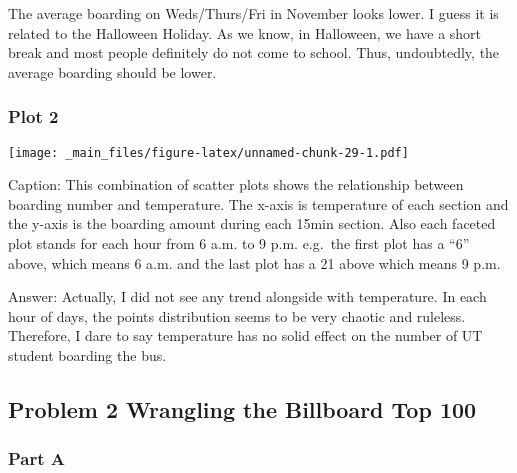 \documentclass[
]{article}
\begin{document}
The average boarding on Weds/Thurs/Fri in November looks lower. I guess it is related to the Halloween Holiday. As we know, in Halloween, we have a short break and most people definitely do not come to school. Thus, undoubtedly, the average boarding should be lower.

\hypertarget{plot-2}{%
\subsubsection{Plot 2}\label{plot-2}}

\texttt{[image: \_main\_files/figure-latex/unnamed-chunk-29-1.pdf]}

Caption: This combination of scatter plots shows the relationship between boarding number and temperature. The x-axis is temperature of each section and the y-axis is the boarding amount during each 15min section. Also each faceted plot stands for each hour from 6 a.m. to 9 p.m. e.g.~the first plot has a ``6'' above, which means 6 a.m. and the last plot has a 21 above which means 9 p.m.

Answer: Actually, I did not see any trend alongside with temperature. In each hour of days, the points distribution seems to be very chaotic and ruleless. Therefore, I dare to say temperature has no solid effect on the number of UT student boarding the bus.

\hypertarget{problem-2-wrangling-the-billboard-top-100}{%
\subsection{Problem 2 Wrangling the Billboard Top 100}\label{problem-2-wrangling-the-billboard-top-100}}

\hypertarget{part-a-3}{%
\subsubsection{Part A}\label{part-a-3}}
\end{document}
